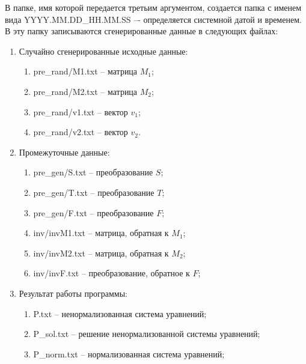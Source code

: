 В папке, имя которой передается третьим аргументом, создается папка с именем вида YYYY.MM.DD\_HH.MM.SS –- определяется системной датой и временем. В эту папку записываются сгенерированные данные в следующих файлах:
\begin{enumerate}
	\item Случайно сгенерированные исходные данные:
	\begin{enumerate}
		\item pre\_rand/M1.txt – матрица \(M_1\);
		\item pre\_rand/M2.txt – матрица \(M_2\);
		\item pre\_rand/v1.txt – вектор \(v_1\);
		\item pre\_rand/v2.txt – вектор \(v_2\).
	\end{enumerate} 
	\item Промежуточные данные:
	\begin{enumerate}
		\item pre\_gen/S.txt – преобразование \(S\);
		\item pre\_gen/T.txt – преобразование \(T\);
		\item pre\_gen/F.txt – преобразование \(F\);
		\item inv/invM1.txt – матрица, обратная к  \(M_1\);
		\item inv/invM2.txt – матрица, обратная к  \(M_2\);
		\item inv/invF.txt – преобразование, обратное к  \(F\);
	\end{enumerate} 
	\item Результат работы программы:
	\begin{enumerate}
		\item P.txt – ненормализованная система уравнений;		\item P\_sol.txt – решение ненормализованной системы уравнений;
		\item P\_norm.txt – нормализованная система уравнений;
	\end{enumerate} 
\end{enumerate} 





